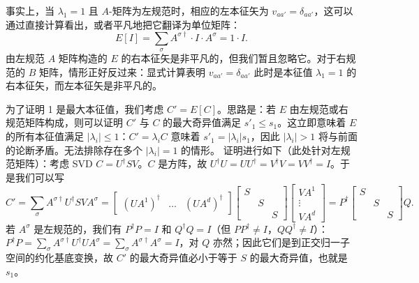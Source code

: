 \documentclass[a4paper,10pt,oneside,onecolumn,1p,times]{elsarticle}
\begin{document}
事实上，当 $\lambda_1=1$ 且 $A$-矩阵为左规范时，相应的左本征矢为 $v_{aa'}=\delta_{aa'}$，这可以通过直接计算看出，或者平凡地把它翻译为单位矩阵：
\begin{equation}
E[I] = \sum_\sigma A^{\sigma\dagger} \cdot I \cdot A^{\sigma} = 1 \cdot I .
\end{equation}
由左规范 $A$ 矩阵构造的 $E$ 的右本征矢是非平凡的，但我们暂且忽略它。对于右规范的 $B$ 矩阵，情形正好反过来：显式计算表明 $v_{aa'}=\delta_{aa'}$ 此时是本征值 $\lambda_1=1$ 的右本征矢，而左本征矢是非平凡的。

为了证明 1 是最大本征值\cite{Weichselbaum05}，我们考虑 $C' = E[C]$。思路是：若 $E$ 由左规范或右规范矩阵构成，则可以证明 $C'$ 与 $C$ 的最大奇异值满足 $s'_1 \leq s_1$。这立即意味着 $E$ 的所有本征值满足 $|\lambda_i| \leq 1$：$C'=\lambda_i C$ 意味着 $s'_1 = |\lambda_i| s_1$，因此 $|\lambda_i|>1$ 将与前面的论断矛盾。无法排除存在多个 $|\lambda_i|=1$ 的情形。
证明进行如下（此处针对左规范矩阵）：考虑 SVD $C = U^\dagger S V$。$C$ 是方阵，故 $U^\dagger U = UU^\dagger = V^\dagger V = VV^\dagger = I$。于是我们可以写
\begin{equation}
C' = \sum_\sigma A^{\sigma\dagger} U^\dagger S V A^{\sigma} =
\left[ \begin{array}{ccc} (UA^1)^\dagger & \ldots  & (UA^d)^\dagger \end{array} \right]
\left[ \begin{array}{ccc} S & & \\ & S & \\ & & S \end{array} \right]
\left[ \begin{array}{c} VA^1 \\ \vdots \\ VA^d \end{array} \right] = P^\dagger \left[ \begin{array}{ccc} S & & \\ & S & \\ & & S \end{array} \right] Q .
\end{equation}
若 $A^\sigma$ 是左规范的，我们有 $P^\dagger P = I$ 和 $Q^\dagger Q = I$（但 $PP^\dagger \neq I$，$QQ^\dagger \neq I$）：$P^\dagger P =\sum_\sigma A^{\sigma\dagger} U^\dagger U A^\sigma = \sum_\sigma A^{\sigma\dagger} A^\sigma = I$，对 $Q$ 亦然；因此它们是到正交归一子空间的约化基底变换，故 $C'$ 的最大奇异值必小于等于 $S$ 的最大奇异值，也就是 $s_1$。
\end{document}
